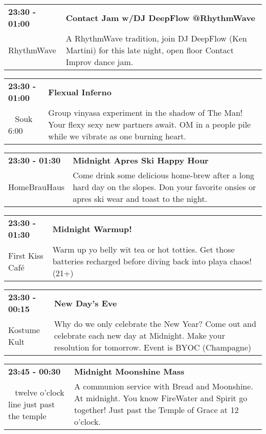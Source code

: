 \begin{tabular}{ p{1in} p{2.2in} }
    \textbf{23:30 - 01:00} & \textbf{Contact Jam w/DJ DeepFlow @RhythmWave} \\
    RhythmWave \newline  & A RhythmWave tradition, join DJ DeepFlow (Ken Martini) for this late night, open floor Contact Improv dance jam. \\
    \hline 
\end{tabular}
    
\begin{tabular}{ p{1in} p{2.2in} }
    \textbf{23:30 - 01:00} & \textbf{Flexual Inferno} \\
    ~ \newline Souk 6:00 & Group vinyasa experiment in the shadow of The Man! Your flexy sexy new partners await. OM in a people pile while we vibrate as one burning heart. \\
    \hline 
\end{tabular}
    
\begin{tabular}{ p{1in} p{2.2in} }
    \textbf{23:30 - 01:30} & \textbf{Midnight Apres Ski Happy Hour} \\
    HomeBrauHaus \newline  & Come drink some delicious home-brew after a long hard day on the slopes.  Don your favorite onsies or apres ski wear and toast to the night. \\
    \hline 
\end{tabular}
    
\begin{tabular}{ p{1in} p{2.2in} }
    \textbf{23:30 - 01:30} & \textbf{Midnight Warmup!} \\
    First Kiss Caf\'e \newline  & Warm up yo belly wit tea or hot totties.  Get those batteries recharged before diving back into playa chaos! (21+) \\
    \hline 
\end{tabular}
    
\begin{tabular}{ p{1in} p{2.2in} }
    \textbf{23:30 - 00:15} & \textbf{New Day's Eve} \\
    Kostume Kult \newline  & Why do we only celebrate the New Year?  Come out and celebrate each new day at Midnight. Make your resolution for tomorrow.  Event is BYOC (Champagne) \\
    \hline 
\end{tabular}
    
\begin{tabular}{ p{1in} p{2.2in} }
    \textbf{23:45 - 00:30} & \textbf{Midnight Moonshine Mass} \\
    ~ \newline twelve o'clock line just past the temple & A communion service with Bread and Moonshine. At midnight. You know FireWater and Spirit go together! Just past the Temple of Grace at 12 o'clock. \\
    \hline 
\end{tabular}
    
